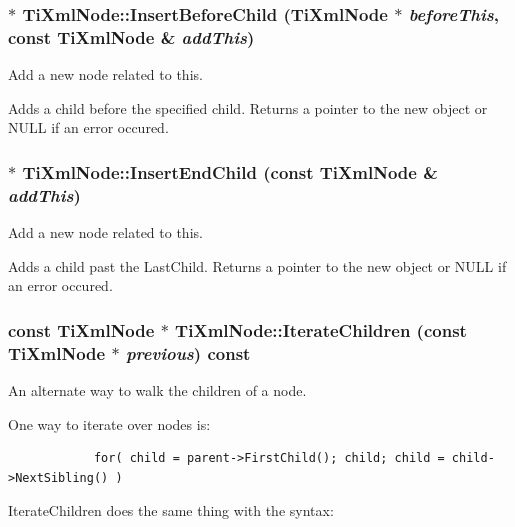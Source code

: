 \subsubsection{ $\ast$ Ti\-Xml\-Node::Insert\-Before\-Child ({\bf Ti\-Xml\-Node} $\ast$ {\em before\-This}, const {\bf Ti\-Xml\-Node} \& {\em add\-This})\hspace{0.3cm}{\tt  [inherited]}}\label{classTiXmlNode_TiXmlUnknowna34}


Add a new node related to this. 

Adds a child before the specified child. Returns a pointer to the new object or NULL if an error occured.
\subsubsection{ $\ast$ Ti\-Xml\-Node::Insert\-End\-Child (const {\bf Ti\-Xml\-Node} \& {\em add\-This})\hspace{0.3cm}{\tt  [inherited]}}\label{classTiXmlNode_TiXmlUnknowna32}


Add a new node related to this. 

Adds a child past the Last\-Child. Returns a pointer to the new object or NULL if an error occured.
\subsubsection{\setlength{\rightskip}{0pt plus 5cm}const {\bf Ti\-Xml\-Node} $\ast$ Ti\-Xml\-Node::Iterate\-Children (const {\bf Ti\-Xml\-Node} $\ast$ {\em previous}) const\hspace{0.3cm}{\tt  [inherited]}}\label{classTiXmlNode_TiXmlUnknowna26}


An alternate way to walk the children of a node. 

One way to iterate over nodes is: 

\footnotesize\begin{verbatim}
			for( child = parent->FirstChild(); child; child = child->NextSibling() )
		\end{verbatim}
\normalsize


Iterate\-Children does the same thing with the syntax: 

